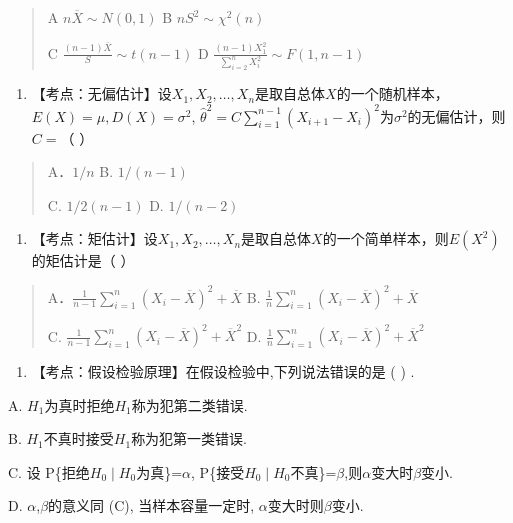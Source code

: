 \documentclass[fontset=exam]{exam-zh}
\begin{document}
\begin{quote}
A \(n\overline X\sim N(0,1)\) B \(nS^2\sim\chi^2(n)\)

C \(\frac{(n-1)\overline X}{S}\sim t(n-1)\) D \(\frac{(n-1)X_1^2}{\sum_{i=2}^nX_i^2}\sim F(1,n-1)\)
\end{quote}

\begin{enumerate}
\def\labelenumi{\arabic{enumi}.}
\setcounter{enumi}{3}
\item
  【考点：无偏估计】设\(X_1,X_2,\ldots,X_n\)是取自总体\(X\)的一个随机样本， \(E(X)=\mu,D(X)=\sigma^2\), \(\widehat\theta^2=C\sum_{i=1}^{n-1}(X_{i+1}-X_i)^2\)为\(\sigma^2\)的无偏估计，则\(C=\)（ ）
\end{enumerate}

\begin{quote}
A．\(1/n\) B. \(1/(n-1)\)

C. \(1/2(n-1)\) D. \(1/(n-2)\)
\end{quote}

\begin{enumerate}
\def\labelenumi{\arabic{enumi}.}
\setcounter{enumi}{4}
\item
  【考点：矩估计】设\(X_1,X_2,\ldots,X_n\)是取自总体\(X\)的一个简单样本，则\(E(X^2)\)的矩估计是（ ）
\end{enumerate}

\begin{quote}
A．\(\frac1{n-1}\sum_{i=1}^n(X_i-\overline X)^2+\overline X\) B. \(\frac1n\sum_{i=1}^n(X_i-\overline X)^2+\overline X\)

C. \(\frac1{n-1}\sum_{i=1}^n(X_i-\overline X)^2+\overline X^2\) D. \(\frac1n\sum_{i=1}^n(X_i-\overline X)^2+\overline X^2\)
\end{quote}

\begin{enumerate}
\def\labelenumi{\arabic{enumi}.}
\setcounter{enumi}{5}
\item
  【考点：假设检验原理】在假设检验中,下列说法错误的是 ( ) .
\end{enumerate}

A. \(H_1\)为真时拒绝\(H_1\)称为犯第二类错误.

B. \(H_1\)不真时接受\(H_1\)称为犯第一类错误.

C. 设 P\{拒绝\(H_0\mid H_0\)为真\}=\(\alpha\), P\{接受\(H_0\mid H_0\)不真\}=\(\beta\),则\(\alpha\)变大时\(\beta\)变小.

D. \(\alpha\),\(\beta\)的意义同 (C), 当样本容量一定时, \(\alpha\)变大时则\(\beta\)变小.
\end{document}
